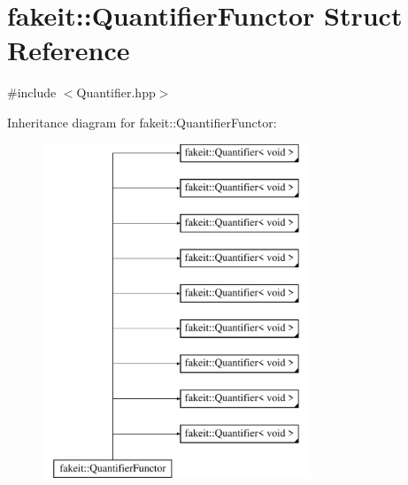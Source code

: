 \hypertarget{structfakeit_1_1QuantifierFunctor}{}\section{fakeit\+::Quantifier\+Functor Struct Reference}
\label{structfakeit_1_1QuantifierFunctor}


{\ttfamily \#include $<$Quantifier.\+hpp$>$}

Inheritance diagram for fakeit\+::Quantifier\+Functor\+:\begin{figure}[H]
\begin{center}
\leavevmode
\includegraphics[height=10.000000cm]{structfakeit_1_1QuantifierFunctor}
\end{center}
\end{figure}
